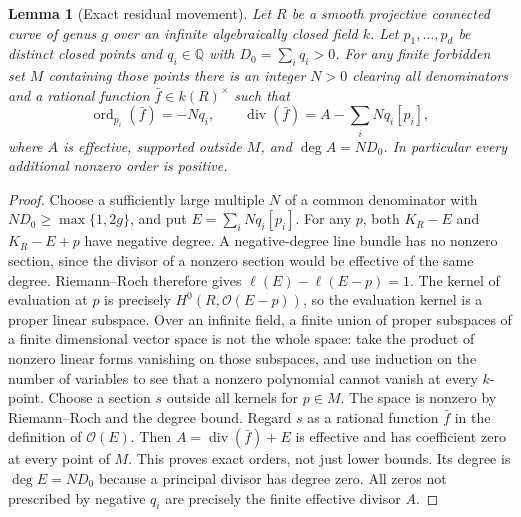 \documentclass[11pt]{article}
\newtheorem{lemma}[theorem]{Lemma}
\newcommand{\ord}{\operatorname{ord}}
\begin{document}
\begin{lemma}[Exact residual movement]\label{lem:rr}
Let $R$ be a smooth projective connected curve of genus $g$ over an
infinite algebraically closed field $k$. Let $p_1,\ldots,p_d$ be distinct
closed points and $q_i\in\mathbb Q$ with $D_0=\sum_i q_i>0$.
For any finite forbidden set $M$ containing those points there is
an integer $N>0$ clearing all denominators and a rational function
$\bar f\in k(R)^\times$ such that
\[
 \ord_{p_i}(\bar f)=-Nq_i,
 \qquad
 \operatorname{div}(\bar f)=A-\sum_i Nq_i[p_i],
\]
where $A$ is effective, supported outside $M$, and $\deg A=ND_0$.
In particular every additional nonzero order is positive.
\end{lemma}
\begin{proof}
Choose a sufficiently large multiple $N$ of a common denominator with
$ND_0\geq\max\{1,2g\}$, and put $E=\sum_iNq_i[p_i]$.
For any $p$, both $K_R-E$ and $K_R-E+p$ have negative degree.
A negative-degree line bundle has no nonzero section, since the
divisor of a nonzero section would be effective of the same degree.
Riemann--Roch therefore gives $\ell(E)-\ell(E-p)=1$.
The kernel of evaluation at $p$ is precisely $H^0(R,\mathcal O(E-p))$,
so the evaluation kernel is a proper linear subspace.
Over an infinite field, a finite union of proper subspaces of a finite
dimensional vector space is not the whole space: take the product of
nonzero linear forms vanishing on those subspaces, and use induction
on the number of variables to see that a nonzero polynomial cannot
vanish at every $k$-point. Choose a section $s$ outside all kernels
for $p\in M$. The space is nonzero by Riemann--Roch and the degree
bound. Regard $s$ as a rational function $\bar f$ in the definition
of $\mathcal O(E)$. Then $A=\operatorname{div}(\bar f)+E$ is effective
and has coefficient zero at every point of $M$. This proves exact
orders, not just lower bounds. Its degree is $\deg E=ND_0$ because
a principal divisor has degree zero. All zeros not prescribed by
negative $q_i$ are precisely the finite effective divisor $A$.
\end{proof}
\end{document}
